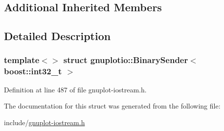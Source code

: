 \subsection*{Additional Inherited Members}


\subsection{Detailed Description}
\subsubsection*{template$<$$>$\newline
struct gnuplotio\+::\+Binary\+Sender$<$ boost\+::int32\+\_\+t $>$}



Definition at line 487 of file gnuplot-\/iostream.\+h.



The documentation for this struct was generated from the following file\+:\begin{DoxyCompactItemize}
\item 
include/\hyperlink{gnuplot-iostream_8h}{gnuplot-\/iostream.\+h}\end{DoxyCompactItemize}
